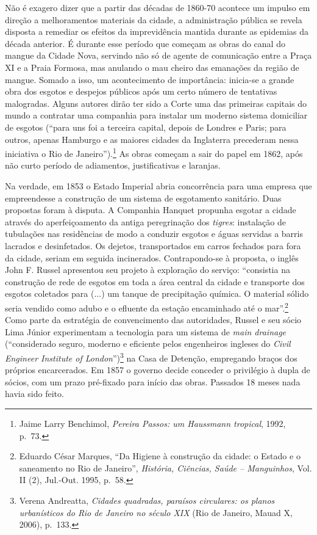 Não é exagero dizer que a partir das décadas de 1860-70 acontece um
impulso em direção a melhoramentos materiais da cidade, a administração
pública se revela disposta a remediar os efeitos da imprevidência
mantida durante as epidemias da década anterior. É durante esse período
que começam as obras do canal do mangue da Cidade Nova, servindo não só
de agente de comunicação entre a Praça XI e a Praia Formosa, mas
anulando o mau cheiro das emanações da região de mangue. Somado a isso,
um acontecimento de importância: inicia-se a grande obra dos esgotos e
despejos públicos após um certo número de tentativas malogradas. Alguns
autores dirão ter sido a Corte uma das primeiras capitais do mundo a
contratar uma companhia para instalar um moderno sistema domiciliar de
esgotos (``para uns foi a terceira capital, depois de Londres e Paris;
para outros, apenas Hamburgo e as maiores cidades da Inglaterra
precederam nessa iniciativa o Rio de Janeiro'').\footnote{Jaime Larry
  Benchimol, \emph{Pereira Passos: um Haussmann tropical}, 1992, p.~73.}
As obras começam a sair do papel em 1862, após não curto período de
adiamentos, justificativas e laranjas.

Na verdade, em 1853 o Estado Imperial abria concorrência para uma
empresa que empreendesse a construção de um sistema de esgotamento
sanitário. Duas propostas foram à disputa. A Companhia Hanquet propunha
esgotar a cidade através do aperfeiçoamento da antiga peregrinação dos
\emph{tigres}: instalação de tubulações nas residências de modo a
conduzir esgotos e águas servidas a barris lacrados e desinfetados. Os
dejetos, transportados em carros fechados para fora da cidade, seriam em
seguida incinerados. Contrapondo-se à proposta, o inglês John F. Russel
apresentou seu projeto à exploração do serviço: ``consistia na
construção de rede de esgotos em toda a área central da cidade e
transporte dos esgotos coletados para (...) um tanque de precipitação
química. O material sólido seria vendido como adubo e o efluente da
estação encaminhado até o mar''.\footnote{Eduardo César Marques, ``Da
  Higiene à construção da cidade: o Estado e o saneamento no Rio de
  Janeiro'', \emph{História, Ciências, Saúde -- Manguinhos}, Vol. II
  (2), Jul.-Out. 1995, p.~58.} Como parte da estratégia de convencimento
das autoridades, Russel e seu sócio Lima Júnior experimentam a
tecnologia para um sistema de \emph{main drainage} (``considerado
seguro, moderno e eficiente pelos engenheiros ingleses do \emph{Civil
Engineer Institute of London}'')\footnote{Verena Andreatta,
  \emph{Cidades quadradas, paraísos circulares: os planos urbanísticos
  do Rio de Janeiro no século XIX} (Rio de Janeiro, Mauad X, 2006),
  p.~133.} na Casa de Detenção, empregando braços dos próprios
encarcerados. Em 1857 o governo decide conceder o privilégio à dupla de
sócios, com um prazo pré-fixado para início das obras. Passados 18 meses
nada havia sido feito.

